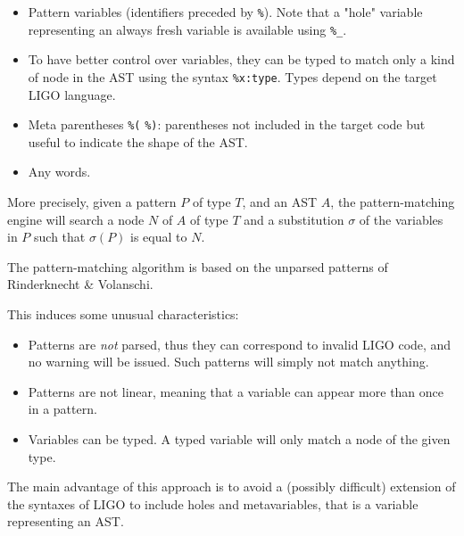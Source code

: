 \documentclass[10pt,a4paper]{article}
\begin{document}
\begin{itemize}
\item
  Pattern variables (identifiers preceded by \verb|%|). Note that a
  "hole" variable representing an always fresh variable is available
  using \verb|%_|.

\item
  To have better control over variables, they can be typed to match
  only a kind of node in the AST using the syntax
  \verb|%x:type|. Types depend on the target LIGO language.

\item
  Meta parentheses \verb|%(| \verb|%)|: parentheses not included in
  the target code but useful to indicate the shape of the AST.

\item
  Any words.
\end{itemize}


More precisely, given a pattern $P$ of type $T$, and an AST $A$, the
pattern-matching engine will search a node $N$ of $A$ of type $T$ and
a substitution $\sigma$ of the variables in $P$ such that $\sigma(P)$
is equal to $N$.

The pattern-matching algorithm is based on the unparsed patterns of
Rinderknecht \& Volanschi\cite{unparsedpatterns}.

This induces some unusual characteristics:
\begin{itemize}
\item
  Patterns are \emph{not} parsed, thus they can correspond to invalid
  LIGO code, and no warning will be issued. Such patterns will simply
  not match anything.

\item
  Patterns are not linear, meaning that a variable can appear more
  than once in a pattern.

\item
  Variables can be typed. A typed variable will only match a node of
  the given type.
\end{itemize}

The main advantage of this approach is to avoid a (possibly difficult)
extension of the syntaxes of LIGO to include holes and metavariables,
that is a variable representing an AST.
\end{document}
